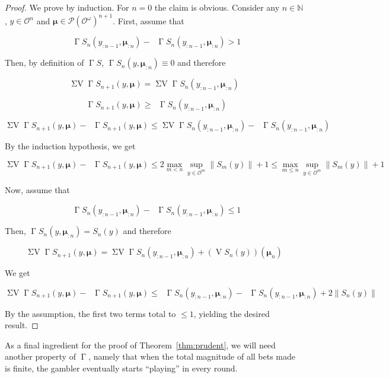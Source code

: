 \documentclass[aop,preprint]{imsart}
\numberwithin{equation}{section}
\theoremstyle{definition}
\theoremstyle{plain}
\newcommand{\Nats}{\mathbb{N}}
\newcommand{\N}[1]{\lVert #1 \rVert}
\newcommand{\PM}{\mathcal{P}}
\newcommand{\Ob}{\mathcal{O}}
\newcommand{\OO}{\Ob^\omega}
\newcommand{\PMO}{\PM(\OO)}
\DeclareMathOperator{\V}{V}
\DeclareMathOperator{\SV}{\Sigma V}
\DeclareMathOperator{\SVM}{\Sigma V_{\min}}
\DeclareMathOperator{\SVX}{\Sigma V_{\max}}
\DeclareMathOperator{\PG}{\Gamma}
\newcommand{\BM}{\bm{\mu}}
\begin{document}
\begin{proof}

We prove by induction. For $n=0$ the claim is obvious. Consider any ${n \in \Nats}$, $y \in \Ob^{n}$ and $\BM \in \PMO^{n+1}$. First, assume that

$$\SVX \PG{S}_n\left(y_{:n-1},\BM_{:n}\right) - \SVM \PG{S}_n\left(y_{:n-1},\BM_{:n}\right) > 1$$

Then, by definition of ${\PG{S}}$, ${\PG{S}_n}\left(y,\BM_{:n}\right) \equiv 0$ and therefore

$$\SV \PG{S}_{n+1}\left(y,\BM\right)=\SV \PG{S}_n\left(y_{:n-1},\BM_{:n}\right)$$

$$\SVM \PG{S}_{n+1}\left(y,\BM\right) \geq \SVM \PG{S}_n\left(y_{:n-1},\BM_{:n}\right)$$

$$\SV \PG{S}_{n+1}\left(y,\BM\right) - \SVM \PG{S}_{n+1}\left(y,\BM\right) \leq \SV \PG{S}_n\left(y_{:n-1},\BM_{:n}\right) - \SVM \PG{S}_n\left(y_{:n-1},\BM_{:n}\right) $$

By the induction hypothesis, we get

$$\SV \PG{S}_{n+1}\left(y,\BM\right) - \SVM \PG{S}_{n+1}\left(y,\BM\right) \leq  2 \max_{m < n} \sup_{y \in \Ob^m} \N{S_m\left(y\right)}  + 1 \leq \max_{m \leq n} \sup_{y \in \Ob^m} \N{S_m\left(y\right)}  + 1$$

Now, assume that 

$$\SVX \PG{S}_n\left(y_{:n-1},\BM_{:n}\right) - \SVM \PG{S}_n\left(y_{:n-1},\BM_{:n}\right) \leq 1$$

Then, ${\PG{S}_n}\left(y,\BM_{:n}\right) = {S_n}\left(y\right)$ and therefore

$$\SV \PG{S}_{n+1}\left(y,\BM\right)=\SV \PG{S}_n\left(y_{:n-1},\BM_{:n}\right) + \left(\V{S}_n\left(y\right)\right)\left(\BM_n\right)$$

We get

$$\SV \PG{S}_{n+1}\left(y,\BM\right) - \SVM \PG{S}_{n+1}\left(y,\BM\right) \leq \SVX \PG{S}_n\left(y_{:n-1},\BM_{:n}\right) - \SVM \PG{S}_n\left(y_{:n-1},\BM_{:n}\right) + 2 \N{S_n\left(y\right)}$$

By the assumption, the first two terms total to ${\leq 1}$, yielding the desired result.
\end{proof}

As a final ingredient for the proof of Theorem~\ref{thm:prudent}, we will need another property of $\PG$, namely that when the total magnitude of all bets made is finite, the gambler eventually starts \enquote{playing} in every round.
\end{document}
